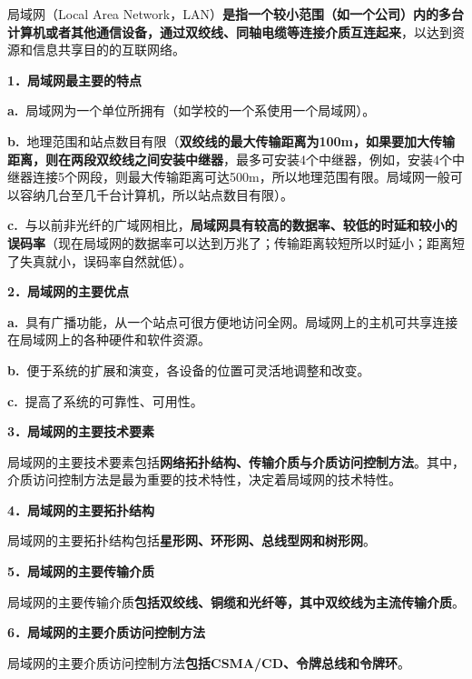局域网（Local Area
Network，LAN）\textbf{{是指一个较小范围（如一个公司）内的多台计算机或者其他通信设备，通过双绞线、同轴电缆等连接介质互连起来}}，以达到资源和信息共享目的的互联网络。

\textbf{{1．局域网最主要的特点}}

\textbf{a.~}局域网为一个单位所拥有（如学校的一个系使用一个局域网）。

\textbf{b.~}地理范围和站点数目有限（{\textbf{双绞线的最大传输距离为100m，如果要加大传输距离，则在两段双绞线之间安装中继器}}，最多可安装4个中继器，例如，安装4个中继器连接5个网段，则最大传输距离可达500m，所以地理范围有限。局域网一般可以容纳几台至几千台计算机，所以站点数目有限）。

\textbf{c.~}与以前非光纤的广域网相比，{\textbf{局域网具有较高的数据率、较低的时延和较小的误码率}}（现在局域网的数据率可以达到万兆了；传输距离较短所以时延小；距离短了失真就小，误码率自然就低）。

\textbf{{2．局域网的主要优点}}

\textbf{a.~}{具有广播功能}，从一个站点可很方便地访问全网。局域网上的主机可共享连接在局域网上的各种硬件和软件资源。

\textbf{b.~}便于系统的扩展和演变，各设备的位置可灵活地调整和改变。

\textbf{c.~}提高了系统的可靠性、可用性。

\textbf{{3．局域网的主要技术要素}}

局域网的主要技术要素包括{\textbf{网络拓扑结构、传输介质与介质访问控制方法}}。其中，介质访问控制方法是最为重要的技术特性，决定着局域网的技术特性。

\textbf{{4．局域网的主要拓扑结构}}

局域网的主要拓扑结构包括{\textbf{星形网、环形网、总线型网和树形网}}。

\textbf{{5．局域网的主要传输介质}}

局域网的主要传输介质{\textbf{包括双绞线、铜缆和光纤等，其中双绞线为主流传输介质}}。

\textbf{{6．局域网的主要介质访问控制方法}}

局域网的主要介质访问控制方法{\textbf{包括CSMA/CD、令牌总线和令牌环}}。
